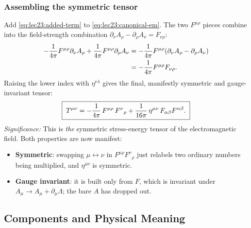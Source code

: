 \subsubsection*{Assembling the symmetric tensor}
Add \eqref{eq:lec23:added-term} to \eqref{eq:lec23:canonical-em}. The two $F^{\mu\rho}$
pieces combine into the field-strength combination
$\partial_\nu A_\rho-\partial_\rho A_\nu=F_{\nu\rho}$:
\begin{align}
  -\frac{1}{4\pi}F^{\mu\rho}\partial_\nu A_\rho
  +\frac{1}{4\pi}F^{\mu\rho}\partial_\rho A_\nu
  &=-\frac{1}{4\pi}F^{\mu\rho}\qty(\partial_\nu A_\rho-\partial_\rho A_\nu)\notag\\
  &=-\frac{1}{4\pi}F^{\mu\rho}F_{\nu\rho}.
  \label{eq:lec23:combine}
\end{align}
Raising the lower index with $\eta^{\nu\lambda}$ gives the final, manifestly symmetric and
gauge-invariant tensor:
\begin{equation}\label{eq:lec23:symmetric-T}
  \boxed{\;
  T^{\mu\nu}
  =-\frac{1}{4\pi}\,F^{\mu\rho}\,F^{\nu}{}_{\rho}
   +\frac{1}{16\pi}\,\eta^{\mu\nu}\,F_{\alpha\beta}F^{\alpha\beta}.\;}
\end{equation}
\textit{Significance:} This is \emph{the} symmetric stress-energy tensor of the
electromagnetic field. Both properties are now manifest:
\begin{itemize}
  \item \textbf{Symmetric}: swapping $\mu\leftrightarrow\nu$ in
        $F^{\mu\rho}F^{\nu}{}_{\rho}$ just relabels two ordinary numbers being multiplied,
        and $\eta^{\mu\nu}$ is symmetric.
  \item \textbf{Gauge invariant}: it is built only from $F$, which is invariant under
        $A_\mu\to A_\mu+\partial_\mu\Lambda$; the bare $A$ has dropped out.
\end{itemize}


\subsection{Components and Physical Meaning}
\label{subsec:lec23:components}

